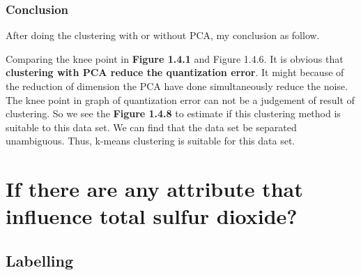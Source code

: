 \documentclass[titlepage,a4paper,12pt,thmsb]{report}
\begin{document}
{\begin{center}
\begin{figure}[h]
{\par}
\end{figure}
{}
\end{center}


\newpage

\subsection{Conclusion}

After  doing the clustering with or without PCA, my conclusion as follow.

Comparing the knee point in {\bf Figure 1.4.1} and {Figure 1.4.6}. It is obvious that {\bf clustering with PCA reduce the quantization error}. It might because of the reduction of dimension the PCA have done simultaneously reduce the noise.
The knee point in graph of quantization error can not be a judgement of result of clustering. So we see the {\bf Figure 1.4.8} to estimate if this clustering method is suitable to this data set. We can find that the data set be separated unambiguous. Thus, k-means clustering is suitable for this data set.


\newpage




\chapter{If there are any attribute that influence total sulfur dioxide?}

\section{Labelling}

}
\end{document}
